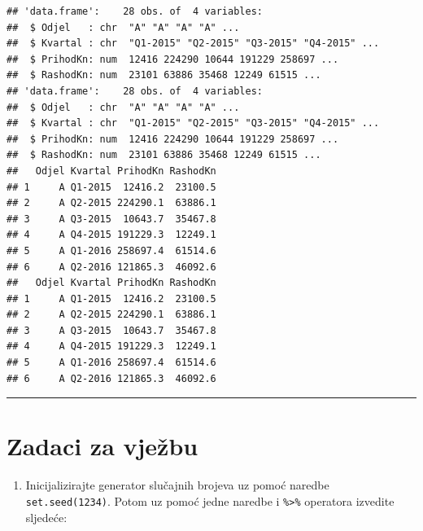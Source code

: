 \documentclass[]{book}
\newenvironment{Shaded}{\begin{snugshade}}{\end{snugshade}}
\newcommand{\KeywordTok}[1]{\textcolor[rgb]{0.13,0.29,0.53}{\textbf{#1}}}
\newcommand{\DataTypeTok}[1]{\textcolor[rgb]{0.13,0.29,0.53}{#1}}
\newcommand{\StringTok}[1]{\textcolor[rgb]{0.31,0.60,0.02}{#1}}
\newcommand{\OperatorTok}[1]{\textcolor[rgb]{0.81,0.36,0.00}{\textbf{#1}}}
\newcommand{\NormalTok}[1]{#1}
\providecommand{\tightlist}{%
  \setlength{\itemsep}{0pt}\setlength{\parskip}{0pt}}
\theoremstyle{definition}
\theoremstyle{definition}
\theoremstyle{definition}
\theoremstyle{remark}
\begin{document}
\begin{Shaded}
\end{Shaded}

\begin{verbatim}
## 'data.frame':    28 obs. of  4 variables:
##  $ Odjel   : chr  "A" "A" "A" "A" ...
##  $ Kvartal : chr  "Q1-2015" "Q2-2015" "Q3-2015" "Q4-2015" ...
##  $ PrihodKn: num  12416 224290 10644 191229 258697 ...
##  $ RashodKn: num  23101 63886 35468 12249 61515 ...
## 'data.frame':    28 obs. of  4 variables:
##  $ Odjel   : chr  "A" "A" "A" "A" ...
##  $ Kvartal : chr  "Q1-2015" "Q2-2015" "Q3-2015" "Q4-2015" ...
##  $ PrihodKn: num  12416 224290 10644 191229 258697 ...
##  $ RashodKn: num  23101 63886 35468 12249 61515 ...
##   Odjel Kvartal PrihodKn RashodKn
## 1     A Q1-2015  12416.2  23100.5
## 2     A Q2-2015 224290.1  63886.1
## 3     A Q3-2015  10643.7  35467.8
## 4     A Q4-2015 191229.3  12249.1
## 5     A Q1-2016 258697.4  61514.6
## 6     A Q2-2016 121865.3  46092.6
##   Odjel Kvartal PrihodKn RashodKn
## 1     A Q1-2015  12416.2  23100.5
## 2     A Q2-2015 224290.1  63886.1
## 3     A Q3-2015  10643.7  35467.8
## 4     A Q4-2015 191229.3  12249.1
## 5     A Q1-2016 258697.4  61514.6
## 6     A Q2-2016 121865.3  46092.6
\end{verbatim}

\begin{center}\rule{0.5\linewidth}{\linethickness}\end{center}

\section*{Zadaci za vježbu}\label{zadaci-za-vjezbu-7}

\begin{enumerate}
\def\labelenumi{\arabic{enumi}.}
\tightlist
\item
  Inicijalizirajte generator slučajnih brojeva uz pomoć naredbe
  \texttt{set.seed(1234)}. Potom uz pomoć jedne naredbe i
  \texttt{\%\textgreater{}\%} operatora izvedite sljedeće:
\end{enumerate}
\end{document}
